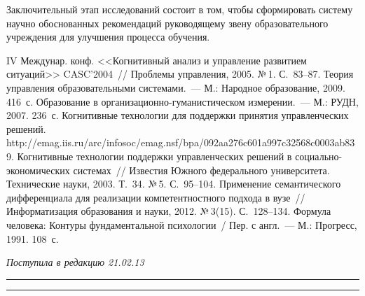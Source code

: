 \begin{multicols}{2}
     Заключительный этап исследований состоит в том, чтобы 
сформировать систему научно обоснованных рекомендаций руководящему 
звену образовательного учреждения для улучшения процесса обучения.

     
{\small\frenchspacing
{%
\begin{thebibliography}{9}
 IV Междунар. конф. 
<<Когнитивный анализ и управление развитием ситуаций>> CASC'2004~// 
Проблемы управления, 2005. №\,1. С.~83--87.
 Теория управления образовательными системами.~--- М.: 
Народное образование, 2009. 416~с. 
 Образование в 
ор\-га\-ни\-за\-ци\-он\-но-гу\-ма\-ни\-сти\-че\-ском измерении.~--- М.: РУДН, 2007. 236~с.
 Когнитивные 
технологии для поддержки принятия управ\-лен\-че\-ских решений. {\sf 
http://emag.iis.ru/arc/infosoc/\linebreak emag.nsf/bpa/092aa276c601a997c32568c0003ab839}.
 Когнитивные технологии поддержки 
управ\-лен\-че\-ских решений в со\-ци\-аль\-но-эко\-но\-ми\-че\-ских 
сис\-те\-мах~// Известия Южного федерального университета. Технические 
науки, 2003. Т.~34. №\,5. С.~95--104.
 Применение 
семантического дифференциала для реализации компетентностного подхода 
в вузе~// Информатизация образования и науки, 2012. №\,3(15). С.~128--134.
 Формула человека: Контуры фундаментальной 
психологии~/ Пер. с англ.~--- М.: Прогресс, 1991. 108~с.
\end{thebibliography}
} }

\end{multicols}

\vspace*{-12pt}

\hfill{\small\textit{Поступила в редакцию 21.02.13}}


\vspace*{12pt}

\hrule

\vspace*{2pt}

\hrule




\def\tit{DEVELOPMENT OF~LEARNING PROCESS CONTROL MODEL WITH~COGNITIVE TECHNOLOGIES}

